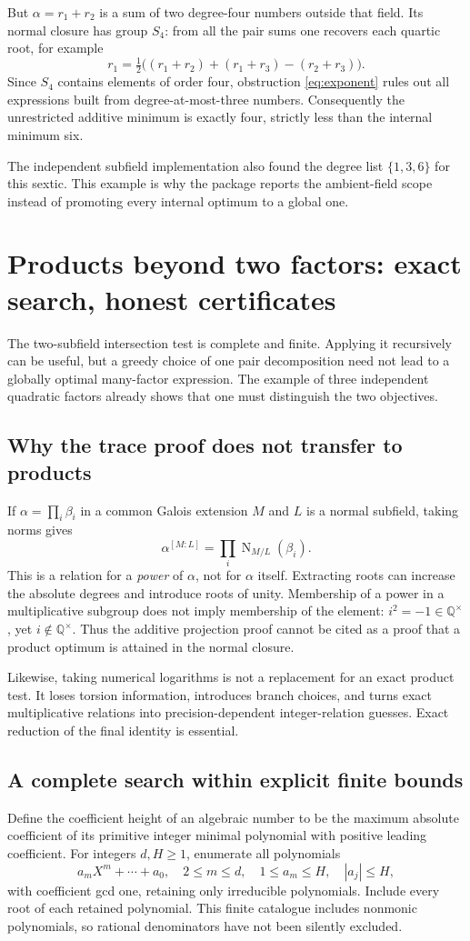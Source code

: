 \documentclass[11pt,a4paper]{article}
\newcommand{\Q}{\mathbb Q}
\newcommand{\Nm}{\operatorname{N}}
\theoremstyle{remark}\newtheorem{remark}[theorem]{Remark}
\begin{document}
But $\alpha=r_1+r_2$ is a sum of two degree-four numbers outside that field. Its normal closure has group $S_4$: from all the pair sums one recovers each quartic root, for example
\[
 r_1=\tfrac12\bigl((r_1+r_2)+(r_1+r_3)-(r_2+r_3)\bigr).
\]
Since $S_4$ contains elements of order four, obstruction \eqref{eq:exponent} rules out all expressions built from degree-at-most-three numbers. Consequently the unrestricted additive minimum is exactly four, strictly less than the internal minimum six.

The independent subfield implementation also found the degree list $\{1,3,6\}$ for this sextic. This example is why the package reports the ambient-field scope instead of promoting every internal optimum to a global one.

\section{Products beyond two factors: exact search, honest certificates}
\label{sec:products}
The two-subfield intersection test is complete and finite. Applying it recursively can be useful, but a greedy choice of one pair decomposition need not lead to a globally optimal many-factor expression. The example of three independent quadratic factors already shows that one must distinguish the two objectives.

\subsection{Why the trace proof does not transfer to products}
If $\alpha=\prod_i\beta_i$ in a common Galois extension $M$ and $L$ is a normal subfield, taking norms gives
\[
 \alpha^{[M:L]}=\prod_i\Nm_{M/L}(\beta_i).
\]
This is a relation for a \emph{power} of $\alpha$, not for $\alpha$ itself. Extracting roots can increase the absolute degrees and introduce roots of unity. Membership of a power in a multiplicative subgroup does not imply membership of the element: $i^2=-1\in\Q^\times$, yet $i\notin\Q^\times$. Thus the additive projection proof cannot be cited as a proof that a product optimum is attained in the normal closure.

Likewise, taking numerical logarithms is not a replacement for an exact product test. It loses torsion information, introduces branch choices, and turns exact multiplicative relations into precision-dependent integer-relation guesses. Exact reduction of the final identity is essential.

\subsection{A complete search within explicit finite bounds}
Define the coefficient height of an algebraic number to be the maximum absolute coefficient of its primitive integer minimal polynomial with positive leading coefficient. For integers $d,H\ge1$, enumerate all polynomials
\[
 a_mX^m+\cdots+a_0,
 \quad 2\le m\le d,\quad
 1\le a_m\le H,\quad |a_j|\le H,
\]
with coefficient gcd one, retaining only irreducible polynomials. Include every root of each retained polynomial. This finite catalogue includes nonmonic polynomials, so rational denominators have not been silently excluded.
\end{document}

